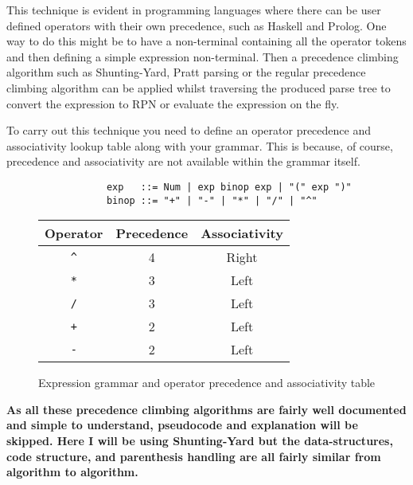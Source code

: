 This technique is evident in programming languages where there can be user defined operators with their own precedence, such as Haskell and Prolog. One way to do this might be to have a non-terminal containing all the operator tokens and then defining a simple expression non-terminal. Then a precedence climbing algorithm such as Shunting-Yard, Pratt parsing or the regular precedence climbing algorithm\textsuperscript{\cite{operator-precedence-parser-wikipedia}} can be applied whilst traversing the produced parse tree to convert the expression to RPN or evaluate the expression on the fly.

To carry out this technique you need to define an operator precedence and associativity lookup table along with your grammar. This is because, of course, precedence and associativity are not available within the grammar itself.

\begin{figure}[H]
    \begin{center}
        \begin{verbatim}
            exp   ::= Num | exp binop exp | "(" exp ")"
            binop ::= "+" | "-" | "*" | "/" | "^"
        \end{verbatim}
        \vspace{1em}
        \begin{tabular}{| c | c | c |}
            \hline
            Operator & Precedence & Associativity\\
            \hline
            \verb|^| & 4 & Right\\
            \hline
            \verb|*| & 3 & Left\\
            \hline
            \verb|/| & 3 & Left\\
            \hline
            \verb|+| & 2 & Left\\
            \hline
            \verb|-| & 2 & Left\\
            \hline
        \end{tabular}
    \end{center}
    \vspace{-1em}
    \caption{\label{fig:4.6}Expression grammar and operator precedence and associativity table}
\end{figure}

\textbf{As all these precedence climbing algorithms are fairly well documented and simple to understand, pseudocode and explanation will be skipped. Here I will be using Shunting-Yard but the data-structures, code structure, and parenthesis handling are all fairly similar from algorithm to algorithm.\textsuperscript{\cite{chu_2016}\cite{chu_2017}}}

